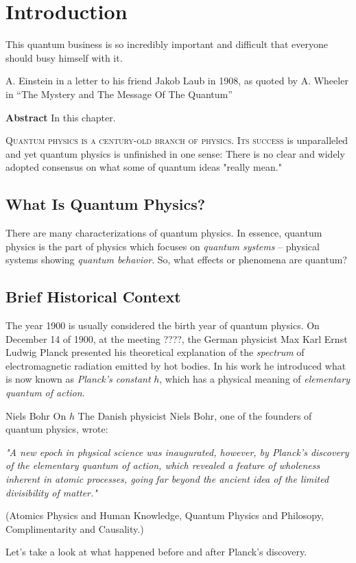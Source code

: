 \graphicspath{{../01Introduction/pics/}}

\chapter{Introduction}\label{ch:Introduction}

\begin{quoting}
	This quantum business is so incredibly important and difficult that everyone should busy himself with it. 
	
	
	A. Einstein in a letter to his friend Jakob Laub in 1908, as quoted by A. Wheeler in “The Mystery and The Message Of The Quantum”
\end{quoting}

{\bf Abstract}\hspace{0.2cm} In this chapter.


\lettrine[lines=2]{\color{darkocre}Q}{uantum physics is a century-old branch of physics. Its success} is unparalleled and yet quantum physics is unfinished in one sense: There is no clear and widely adopted consensus on what some of quantum ideas "really mean."

\section{What Is Quantum Physics?}
There are many characterizations of quantum physics.  In essence, quantum physics is the part of physics which focuses on \emph{quantum systems} -- physical systems showing \emph{quantum behavior}. So, what effects or phenomena are quantum?


\section{Brief Historical Context}
The year 1900 is usually considered the birth year of quantum physics. On December 14 of 1900, at the meeting ????, the German physicist Max Karl Ernst Ludwig Planck presented his theoretical explanation of the \emph{spectrum} of electromagnetic radiation emitted by hot bodies. In his work he introduced what is now known as \emph{Planck's constant}  $h$, which has a physical meaning of \emph{elementary quantum of action}.
\begin{mybio}{Niels Bohr On $h$}
	The Danish physicist Niels Bohr, one of the founders of quantum physics, wrote: 
	
	\emph{
	"A new epoch in physical science was inaugurated, however, by Planck’s discovery of the elementary quantum of action, which revealed a feature of wholeness inherent in atomic processes, going far beyond the ancient idea of the limited divisibility of matter."
}
	
	(Atomics Physics and Human Knowledge, Quantum Physics and Philosopy, Complimentarity and Causality.)
\end{mybio}
Let's take a look at what happened before and after Planck's discovery.


